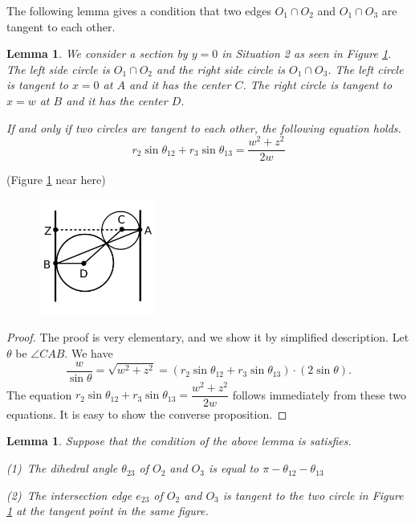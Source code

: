 \documentclass[suppldata, dvipdfmx]{interact}
\theoremstyle{plain}%
\newtheorem{lemma}[theorem]{Lemma}
\theoremstyle{definition}
\theoremstyle{remark}
\theoremstyle{problemstyle}
\begin{document}
The following lemma gives a condition that two edges $O_1\cap O_2$ and $O_1\cap O_3$ are tangent to each other. 

\begin{lemma} \label{lemma:twoCirclesChain}
We consider a section by $y=0$ in Situation 2 as seen in Figure \ref{fig:twoCirclesChain}.  The left side circle is $O_1\cap O_2$ and the right side circle is $O_1\cap O_3$.  The left circle is tangent to $x=0$ at $A$ and it has the center $C$.  The right circle is tangent to $x=w$ at $B$ and it has the center $D$. \par
If and only if two circles are tangent to each other, the following equation holds.
\[
r_2\sin\theta_{12}+r_3\sin\theta_{13}=\dfrac{w^2+z^2}{2w}
\]
\end{lemma}

\noindent(Figure \ref{fig:twoCirclesChain} near here)

\begin{figure}[h!tbp]
 \begin{minipage}[t]{0.5\textwidth}
\centering
  \includegraphics[width=1.5in, height=1.5in,
  keepaspectratio]{./img/HexahedraWithSphericalFaces/twoCirclesSlice.jpg}
 \caption{}
 \label{fig:twoCirclesChain}
 \end{minipage}
\end{figure}

\begin{proof}
The proof is very elementary, and we show it by simplified description.  Let $\theta$ be $\angle CAB$.  We have
\[
\dfrac{w}{\sin\theta}  = \sqrt{w^2+z^2}
 = (r_2\sin\theta_{12}+r_3\sin\theta_{13})\cdot(2\sin\theta ).
\]
The equation $r_2\sin\theta_{12}+r_3\sin\theta_{13}=\dfrac{w^2+z^2}{2w}$ follows immediately from these two equations.  It is easy to show the converse proposition.
\end{proof}

\begin{lemma} \label{lemma:twoCirclesChainAngle}
Suppose that the condition of the above lemma is satisfies.\par
(1)\ The dihedral angle $\theta_{23}$ of $O_2$ and $O_3$ is equal to $\pi - \theta_{12} - \theta_{13}$ \par
(2)\ The intersection edge $e_{23}$ of $O_2$ and $O_3$ is tangent to the two circle in Figure \ref{fig:twoCirclesChain} at the tangent point in the same figure.
\end{lemma}
\end{document}

